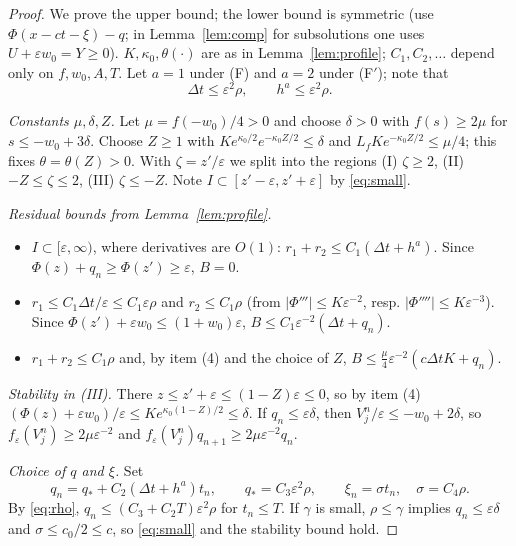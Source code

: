 \documentclass[11pt]{amsart}
\theoremstyle{remark}
\newcommand{\ve}{\varepsilon}
\begin{document}
\begin{proof}
We prove the upper bound; the lower bound is symmetric (use
$\Phi(x-ct-\xi)-q$; in Lemma~\ref{lem:comp} for subsolutions one uses
$U+\ve w_0=Y\ge0$). $K,\kappa_0,\theta(\cdot)$ are as in
Lemma~\ref{lem:profile}; $C_1,C_2,\dots$ depend only on $f,w_0,A,T$. Let
$a=1$ under (F) and $a=2$ under (F$'$); note that
\begin{equation}\label{eq:rho}
\Delta t\le\ve^2\rho,\qquad h^a\le\ve^2\rho .
\end{equation}

\emph{Constants $\mu,\delta,Z$.} Let $\mu=f(-w_0)/4>0$ and choose $\delta>0$ with
$f(s)\ge2\mu$ for $s\le-w_0+3\delta$. Choose $Z\ge1$ with
$Ke^{\kappa_0/2}e^{-\kappa_0Z/2}\le\delta$ and $L_fKe^{-\kappa_0Z/2}\le\mu/4$; this fixes
$\theta=\theta(Z)>0$. With $\zeta=z'/\ve$ we split into the regions
(I) $\zeta\ge2$, (II) $-Z\le\zeta\le2$, (III) $\zeta\le-Z$.
Note $I\subset[z'-\ve,z'+\ve]$ by \eqref{eq:small}.

\emph{Residual bounds from Lemma~\ref{lem:profile}.}
\begin{itemize}
\item[(I)] $I\subset[\ve,\infty)$, where derivatives are $O(1)$:
$r_1+r_2\le C_1(\Delta t+h^a)$. Since $\Phi(z)+q_n\ge\Phi(z')\ge\ve$, $B=0$.
\item[(II)] $r_1\le C_1\Delta t/\ve\le C_1\ve\rho$ and $r_2\le C_1\rho$
(from $|\Phi'''|\le K\ve^{-2}$, resp. $|\Phi''''|\le K\ve^{-3}$). Since
$\Phi(z')+\ve w_0\le(1+w_0)\ve$, $B\le C_1\ve^{-2}(\Delta t+q_n)$.
\item[(III)] $r_1+r_2\le C_1\rho$ and, by item (4) and the choice of $Z$,
$B\le\frac{\mu}{4}\ve^{-2}(c\Delta tK+q_n)$.
\end{itemize}

\emph{Stability in (III).} There $z\le z'+\ve\le(1-Z)\ve\le0$, so by item (4)
$(\Phi(z)+\ve w_0)/\ve\le Ke^{\kappa_0(1-Z)/2}\le\delta$. If
$q_n\le\ve\delta$, then $V^n_j/\ve\le-w_0+2\delta$, so $f_\ve(V^n_j)\ge2\mu\ve^{-2}$
and $f_\ve(V^n_j)q_{n+1}\ge2\mu\ve^{-2}q_n$.

\emph{Choice of $q$ and $\xi$.} Set
\[
q_n=q_*+C_2(\Delta t+h^a)t_n,\qquad q_*=C_3\ve^2\rho,\qquad
\xi_n=\sigma t_n,\quad\sigma=C_4\rho .
\]
By \eqref{eq:rho}, $q_n\le(C_3+C_2T)\ve^2\rho$ for $t_n\le T$. If $\gamma$ is
small, $\rho\le\gamma$ implies $q_n\le\ve\delta$ and $\sigma\le c_0/2\le c$, so
\eqref{eq:small} and the stability bound hold.


\end{proof}
\end{document}
